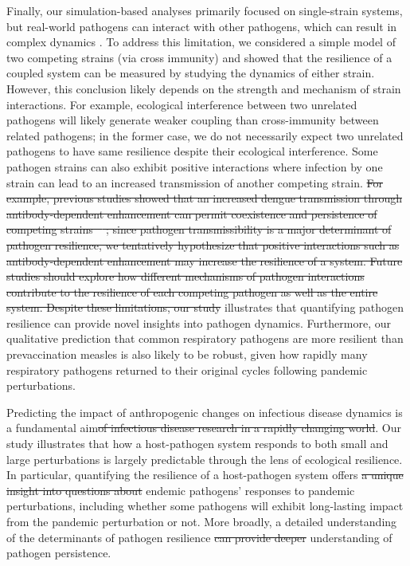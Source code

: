 \documentclass[12pt]{article}
\providecommand{\DIFaddtex}[1]{{\protect\color{blue}\uwave{#1}}} %
\providecommand{\DIFdeltex}[1]{{\protect\color{red}\sout{#1}}}                      %
\providecommand{\DIFaddbegin}{} %
\providecommand{\DIFaddend}{} %
\providecommand{\DIFdelbegin}{} %
\providecommand{\DIFdelend}{} %
\providecommand{\DIFadd}[1]{\texorpdfstring{\DIFaddtex{#1}}{#1}} %
\providecommand{\DIFdel}[1]{\texorpdfstring{\DIFdeltex{#1}}{}} %
\newcommand{\DIFscaledelfig}{0.5}
\newlength{\DIFdelgraphicswidth} %
\newlength{\DIFdelgraphicsheight} %
\newcommand{\DIFaddincludegraphics}[2][]{{\color{blue}\fbox{\DIFOincludegraphics[#1]{#2}}}} %
\newcommand{\DIFdelincludegraphics}[2][]{%
\sbox{\DIFdelgraphicsbox}{\DIFOincludegraphics[#1]{#2}}%
\settoboxwidth{\DIFdelgraphicswidth}{\DIFdelgraphicsbox} %
\settoboxtotalheight{\DIFdelgraphicsheight}{\DIFdelgraphicsbox} %
\scalebox{\DIFscaledelfig}{%
\parbox[b]{\DIFdelgraphicswidth}{\usebox{\DIFdelgraphicsbox}\\[-\baselineskip] \rule{\DIFdelgraphicswidth}{0em}}\llap{\resizebox{\DIFdelgraphicswidth}{\DIFdelgraphicsheight}{%
\setlength{\unitlength}{\DIFdelgraphicswidth}%
\begin{picture}(1,1)%
\thicklines\linethickness{2pt} %
{\color[rgb]{1,0,0}\put(0,0){\framebox(1,1){}}}%
{\color[rgb]{1,0,0}\put(0,0){\line( 1,1){1}}}%
{\color[rgb]{1,0,0}\put(0,1){\line(1,-1){1}}}%
\end{picture}%
}\hspace*{3pt}}} %
} %
\DeclareRobustCommand{\DIFaddbegin}{\DIFOaddbegin \let\includegraphics\DIFaddincludegraphics} %
\DeclareRobustCommand{\DIFaddend}{\DIFOaddend \let\includegraphics\DIFOincludegraphics} %
\DeclareRobustCommand{\DIFdelbegin}{\DIFOdelbegin \let\includegraphics\DIFdelincludegraphics} %
\DeclareRobustCommand{\DIFdelend}{\DIFOaddend \let\includegraphics\DIFOincludegraphics} %
\begin{document}
Finally, our simulation-based analyses primarily focused on single-strain systems, but real-world pathogens can interact with other pathogens, which can result in complex dynamics \citep{rohani2003ecological,nickbakhsh2019virus}.
To address this limitation, we considered a simple model of two competing strains (via cross immunity) and showed that the resilience of a coupled system can be measured by studying the dynamics of either strain. 
However, this conclusion likely depends on the strength and mechanism of strain interactions.
For example, ecological interference between two unrelated pathogens \citep{rohani2003ecological} will likely generate weaker coupling than cross-immunity between related pathogens;
in the former case, we do not necessarily expect two unrelated pathogens to have \DIFaddbegin \DIFadd{the }\DIFaddend same resilience despite their ecological interference.
Some pathogen strains can also exhibit positive interactions where infection by one strain can lead to an increased transmission of another competing strain.
\DIFdelbegin \DIFdel{For example, previous studies showed that an increased dengue transmission through antibody-dependent enhancement can permit coexistence and persistence of competing strains \mbox{%
\citep{ferguson1999effect}}\hskip0pt%
;
since pathogen transmissibility is a major determinant of pathogen resilience, we tentatively hypothesize that positive interactions such as antibody-dependent enhancement may increase the resilience of a system.
Future studies should explore how different mechanisms of pathogen interactions contribute to the resilience of each competing pathogen as well as the entire system.
Despite these limitations, our study }\DIFdelend \DIFaddbegin \DIFadd{Our study nonetheless }\DIFaddend illustrates that quantifying pathogen resilience can provide novel insights into pathogen dynamics.
Furthermore, our qualitative prediction that common respiratory pathogens are more resilient than prevaccination measles is also likely to be robust, given how rapidly many respiratory pathogens returned to their original cycles following pandemic perturbations.

Predicting the impact of anthropogenic changes on infectious disease dynamics is a fundamental aim\DIFdelbegin \DIFdel{of infectious disease research in a rapidly changing world}\DIFdelend .
Our study illustrates that how a host-pathogen system responds to both small and large perturbations is largely predictable through the lens of ecological resilience.
In particular, quantifying the resilience of a host-pathogen system offers \DIFdelbegin \DIFdel{a unique insight into questions about }\DIFdelend \DIFaddbegin \DIFadd{insight into }\DIFaddend endemic pathogens' responses to pandemic perturbations, including whether some pathogens will exhibit long-lasting impact from the pandemic perturbation or not.
More broadly, a detailed understanding of the determinants of pathogen resilience \DIFdelbegin \DIFdel{can provide deeper }\DIFdelend \DIFaddbegin \DIFadd{might improve }\DIFaddend understanding of pathogen persistence.
\end{document}
